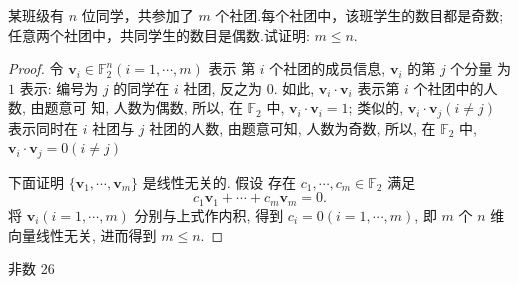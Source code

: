 \documentclass[a4paper, 12pt, UTF8]{ctexart}
\begin{document}
\begin{exa}
    某班级有 $n$ 位同学，共参加了 $m$ 个社团.每个社团中，该班学生的数目都是奇数;任意两个社团中，共同学生的数目是偶数.试证明: $m \leq n$. 
\end{exa}
{\color{GoogleRed}
  \begin{proof}
      令 $\bm{v}_{i} \in \mathbb{F}_{2}^{n}(i = 1, \cdots, m)$ 表示
      第 $i$ 个社团的成员信息, $\bm{v}_{i}$ 的第 $j$ 个分量
      为 $1$ 表示: 编号为 $j$ 的同学在 $i$ 社团, 反之为 $0$. 如此,
      $\bm{v}_{i}\cdot\bm{v}_{i}$ 表示第 $i$ 个社团中的人数, 由题意可
      知, 人数为偶数, 所以, 在 $\mathbb{F}_{2}$ 中,
      $\bm{v}_{i}\cdot\bm{v}_{i}=1$; 类似的,
      $\bm{v}_{i}\cdot\bm{v}_{j}(i \neq j)$ 表示同时在 $i$ 社团与 $j$
      社团的人数, 由题意可知, 人数为奇数, 所以, 在 $\mathbb{F}_{2}$ 中,
      $\bm{v}_{i}\cdot\bm{v}_{j}=0(i\neq j)$

      下面证明 $\{ \bm{v}_{1}, \cdots ,\bm{v}_{m}\}$ 是线性无关的. 假设
      存在 $c_{1}, \cdots, c_{m} \in \mathbb{F}_{2}$ 满足
      \[
          c_{1}\bm{v}_{1} + \cdots + c_{m}\bm{v}_{m} = 0.
      \]
      将 $\bm{v}_{i}(i=1,\cdots,m)$ 分别与上式作内积, 得到 $c_{i}=0(i=1,\cdots,m)$, 即 $m$ 个 $n$ 维向量线性无关, 进而得到 $m \leq n$.
      
\end{proof}
}

{\color{GoogleGreen} 非数 26}
\end{document}
